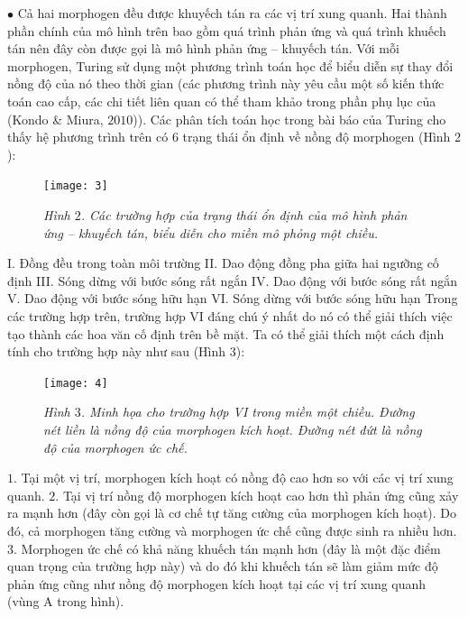 \begin{multicols}{2}
	\vskip 0.05cm
	$\bullet$ Cả hai morphogen đều được khuyếch tán ra các vị trí xung quanh.
	Hai thành phần chính của mô hình trên bao gồm quá trình phản ứng và quá trình khuếch tán nên đây còn được gọi là mô hình phản ứng -- khuyếch tán.
	\vskip 0.05cm
	Với mỗi morphogen, Turing sử dụng một phương trình toán học để biểu diễn sự thay đổi nồng độ của nó theo thời gian (các phương trình này yêu cầu một số kiến thức toán cao cấp, các chi tiết liên quan có thể tham khảo trong phần phụ lục của (Kondo \& Miura, $2010$)). Các phân tích toán học trong bài báo của Turing cho thấy hệ phương trình trên có 6 trạng thái ổn định về nồng độ morphogen (Hình $2$): 
	\begin{figure}[H]
		\vspace*{-5pt}
		\centering
		\captionsetup{labelformat= empty, justification=centering}
		\texttt{[image: 3]}
		\caption{\small\textit{\color{timhieukhoahoc}Hình $2$. Các trường hợp của trạng thái ổn định của mô hình phản ứng -- khuyếch tán, biểu diễn cho miền mô phỏng một chiều.}}
		\vspace*{-10pt}
	\end{figure}
	I. Đồng đều trong toàn môi trường	
	\vskip 0.05cm
	II.	Dao động đồng pha giữa hai ngưỡng cố định
	\vskip 0.05cm
	III. Sóng dừng với bước sóng rất ngắn
	\vskip 0.05cm
	IV.	Dao động với bước sóng rất ngắn
	\vskip 0.05cm
	V. Dao động với bước sóng hữu hạn
	\vskip 0.05cm
	VI.	Sóng dừng với bước sóng hữu hạn
	\vskip 0.05cm
	Trong các trường hợp trên, trường hợp VI đáng chú ý nhất do nó có thể giải thích việc tạo thành các hoa văn cố định trên bề mặt. Ta có thể giải thích một cách định tính cho trường hợp này như sau (Hình $3$): 
	\begin{figure}[H]
		\vspace*{-5pt}
		\centering
		\captionsetup{labelformat= empty, justification=centering}
		\texttt{[image: 4]}
		\caption{\small\textit{\color{timhieukhoahoc}Hình $3$. Minh họa cho trường hợp VI trong miền một chiều. Đường nét liền là nồng độ của morphogen kích hoạt. Đường nét đứt là nồng độ của morphogen ức chế.}}
		\vspace*{-10pt}
	\end{figure}
	$1.$ Tại một vị trí, morphogen kích hoạt có nồng độ cao hơn so với các vị trí xung quanh.
	\vskip 0.05cm
	$2.$ Tại vị trí nồng độ morphogen kích hoạt cao hơn thì phản ứng cũng xảy ra mạnh hơn (đây còn gọi là cơ chế tự tăng cường của morphogen kích hoạt). Do đó, cả morphogen tăng cường và morphogen ức chế cũng được sinh ra nhiều hơn.
	\vskip 0.05cm
	$3.$ Morphogen ức chế có khả năng khuếch tán mạnh hơn (đây là một đặc điểm quan trọng của trường hợp này) và do đó khi khuếch tán sẽ làm giảm mức độ phản ứng cũng như nồng độ morphogen kích hoạt tại các vị trí xung quanh (vùng A trong hình).

\end{multicols}

